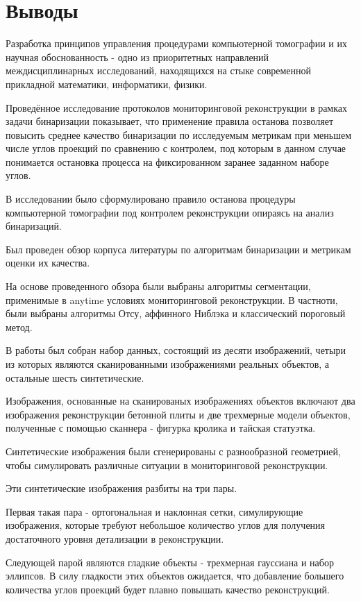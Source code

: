 \section{Выводы}

Разработка принципов управления процедурами компьютерной томографии и их научная обоснованность - одно из приоритетных направлений междисциплинарных исследований, находящихся на стыке современной прикладной математики, информатики, физики.  

Проведённое исследование протоколов мониторинговой реконструкции в рамках задачи бинаризации показывает, что применение правила останова позволяет повысить среднее качество бинаризации по исследуемым метрикам при меньшем числе углов проекций по сравнению с контролем, под которым в данном случае понимается остановка процесса на фиксированном заранее заданном наборе углов.~

В исследовании было сформулировано правило останова процедуры компьютерной томографии под контролем реконструкции опираясь на анализ бинаризаций. 

Был проведен обзор корпуса литературы по алгоритмам бинаризации и метрикам оценки их качества. 

На основе проведенного обзора были выбраны алгоритмы сегментации, применимые в anytime условиях мониторинговой реконструкции. В частноти, были выбраны алгоритмы Отсу, аффинного Ниблэка и классический пороговый метод.

В работы был собран набор данных, состоящий из десяти изображений, четыри из которых являются сканированными изображениями реальных объектов, а остальные шесть синтетические.

Изображения, основанные на сканированых изображениях объектов включают два изображения реконструкции бетонной плиты и две трехмерные модели объектов, полученные с помощью сканнера - фигурка кролика и тайская статуэтка.

Синтетические изображения были сгенерированы с разнообразной геометрией, чтобы симулировать различные ситуации в мониторинговой реконструкции. 

Эти синтетические изображения разбиты на три пары. 

Первая такая пара - ортогональная и наклонная сетки, симулирующие изображения, которые требуют небольшое количество углов для получения достаточного уровня детализации в реконструкции.

Следующей парой являются гладкие объекты - трехмерная гауссиана и набор эллипсов. В силу гладкости этих объектов ожидается, что добавление большего количества углов проекций будет плавно повышать качество реконструкций.

